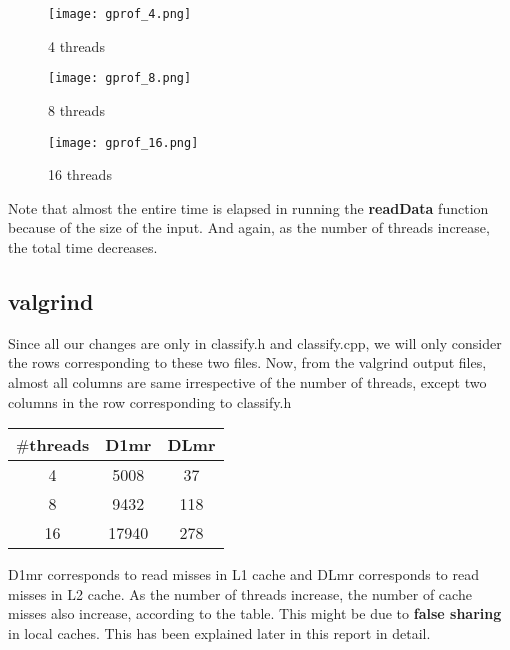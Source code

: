\documentclass{article}
\begin{document}
    \begin{figure}[H]
        \centering
        \texttt{[image: gprof\_4.png]}
        \caption{4 threads}
    \end{figure}
    
    \begin{figure}[H]
        \centering
        \texttt{[image: gprof\_8.png]}
        \caption{8 threads}
    \end{figure}
    
    \begin{figure}[H]
        \centering
        \texttt{[image: gprof\_16.png]}
        \caption{16 threads}
    \end{figure}
    
    Note that almost the entire time is elapsed in running the \textbf{readData} function because of the size of the input. And again, as the number of threads increase, the total time decreases.   

    \newpage
    \subsection{valgrind}
    Since all our changes are only in classify.h and classify.cpp, we will only consider the rows corresponding to these two files. Now, from the valgrind output files, almost all columns are same irrespective of the number of threads, except two columns in the row corresponding to classify.h
    
    \begin{center}
        \begin{tabular}{|c|c|c|}
            \hline
            \textbf{$\#$threads} & \textbf{D1mr} & \textbf{DLmr} \\
            \hline
            4 & 5008 & 37 \\
            \hline
            8 & 9432 & 118 \\
            \hline
            16 & 17940 & 278 \\
            \hline
        \end{tabular}
    \end{center}

    D1mr corresponds to read misses in L1 cache and DLmr corresponds to read misses in L2 cache. As the number of threads increase, the number of cache misses also increase, according to the table. This might be due to \textbf{false sharing} in local caches. This has been explained later in this report in detail. 
    
\end{document}
